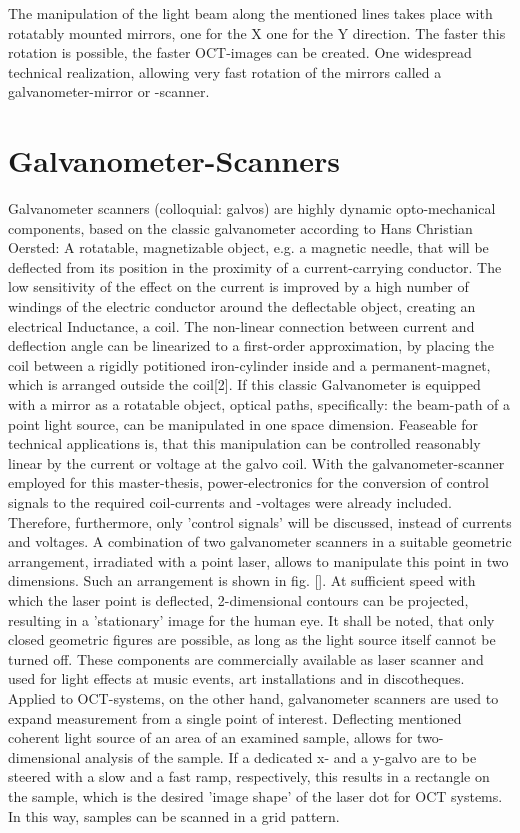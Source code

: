 The manipulation of the light beam along the mentioned lines takes place with rotatably mounted mirrors, one for the X one for the Y direction. The faster this rotation is possible, the faster OCT-images can be created. One widespread technical realization, allowing very fast rotation of the mirrors called a galvanometer-mirror or -scanner.

\section{Galvanometer-Scanners}
Galvanometer scanners (colloquial: galvos) are highly dynamic opto-mechanical components, based on the classic galvanometer according to Hans Christian Oersted: A rotatable, magnetizable object, e.g. a magnetic needle, that will be deflected from its position in the proximity of a current-carrying conductor. The low sensitivity of the effect on the current is improved by a high number of windings of the electric conductor around the deflectable object, creating an electrical Inductance, a coil. The non-linear connection between current and deflection angle can be linearized to a first-order approximation, by placing the coil between a rigidly potitioned iron-cylinder inside and a permanent-magnet, which is arranged outside the coil[2]. 
If this classic Galvanometer is equipped with a mirror as a rotatable object, optical paths, specifically: the beam-path of a point light source, can be manipulated in one space dimension. Feaseable for technical applications is, that this manipulation can be controlled reasonably linear by the current or voltage at the galvo coil. With the galvanometer-scanner employed for this master-thesis, power-electronics for the conversion of control signals to the required coil-currents and -voltages were already included. Therefore, furthermore, only 'control signals' will be discussed, instead of currents and voltages. A combination of two galvanometer scanners in a suitable geometric arrangement, irradiated with a point laser, allows to manipulate this point in two dimensions. Such an arrangement is shown in fig. []. At sufficient speed with which the laser point is deflected, 2-dimensional contours can be projected, resulting in a 'stationary' image for the human eye. It shall be noted, that only closed geometric figures are possible, as long as the light source itself cannot be turned off. These components are commercially available as laser scanner and used for light effects at music events, art installations and in discotheques. Applied to OCT-systems, on the other hand, galvanometer scanners are used to expand measurement from a single point of interest. Deflecting mentioned coherent light source of an area of an examined sample, allows for two-dimensional analysis of the sample. If a dedicated x- and a y-galvo are to be steered with a slow and a fast ramp, respectively, this results in a rectangle on the sample, which is the desired 'image shape' of the laser dot for OCT systems. In this way, samples can be scanned in a grid pattern.

